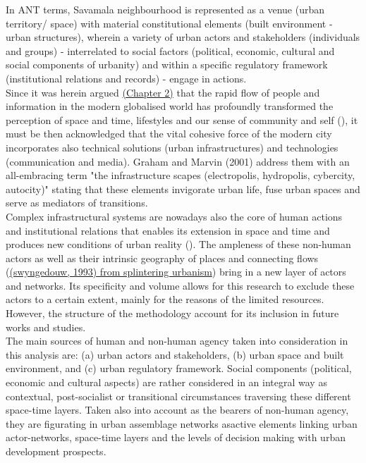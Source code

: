\documentclass[11pt]{report}
\begin{document}
In ANT terms, Savamala neighbourhood is represented as a venue (urban territory/ space) with material constitutional elements (built environment - urban structures), wherein a variety of urban actors and stakeholders (individuals and groups) - interrelated to social factors (political, economic, cultural and social components of urbanity) and within a specific regulatory framework (institutional relations and records) - engage in actions.
\\

Since it was herein argued \href{ref}{(Chapter 2)} that the rapid flow of people and information in the modern globalised world has profoundly transformed the perception of space and time, lifestyles and our sense of community and self (\href{ref}{\citealt{ellin_postmodern_1999}}), it must be then acknowledged that the vital cohesive force of the modern city incorporates also technical solutions (urban infrastructures) and technologies (communication and media).
Graham and Marvin (2001) address them with an  all-embracing term "the infrastructure scapes (electropolis, hydropolis, cybercity, autocity)" stating that these elements invigorate urban life, fuse urban spaces and serve as mediators of transitions.
\\

Complex infrastructural systems are nowadays also the core of human actions and institutional relations that enables its extension in space and time and produces new conditions of urban reality (\href{ref}{\citealt{graham_splintering_2001}}).
The ampleness of these non-human actors as well as their intrinsic geography of places and connecting flows (\href{ref}{(swyngedouw, 1993) from splintering urbanism}) bring in a new layer of actors and networks.
Its specificity and volume allows for this research to exclude these actors to a certain extent, mainly for the reasons of the limited resources. 
However, the structure of the methodology account for its inclusion in future works and studies. 
\\

The main sources of human and non-human agency taken into consideration in this analysis are: (a) urban actors and stakeholders, (b) urban space and built environment, and (c) urban regulatory framework.
Social components (political, economic and cultural aspects) are rather considered in an integral way as contextual, post-socialist or transitional circumstances traversing these different space-time layers.
Taken also into account as the bearers of non-human agency, they are figurating in urban assemblage networks asactive elements linking urban actor-networks, space-time layers and the levels of decision making with urban development prospects.
\\
\end{document}
